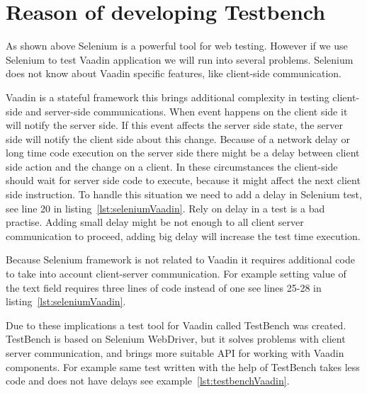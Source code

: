  \section{Reason of developing Testbench}
  	As shown above Selenium is a powerful tool for web testing. However if we use
  	Selenium to test Vaadin application we will run into several problems.
  	Selenium does not know about Vaadin specific features, like client-side
  	communication. 
  	
  	Vaadin is a stateful framework this brings additional complexity in
testing client-side and server-side communications. When event happens on the client side 
it will notify the server side. If this event affects the server side state, the
server side will notify the client side about this change.
 Because of a network delay or long time code execution on the server side there might be a delay between 
 client side action and the change on a client. In these circumstances the client-side should wait for server side code to execute,
  because it might affect the next client side instruction. To handle this
  situation we need to add a delay in Selenium test, see line 20
   in listing~\ref{lst:seleniumVaadin}. Rely on delay in a test is a bad
   practise. Adding small delay might be not enough to all client server
   communication to proceed, adding big delay will increase the test time
   execution. 
   
   Because Selenium framework is not related to Vaadin it requires additional
   code to take into account client-server communication. For example setting
   value of the text field requires three lines of code instead of one see lines
   25-28 in listing~\ref{lst:seleniumVaadin}.
   
   Due to these implications a test tool for Vaadin called TestBench was
   created. TestBench is based on Selenium WebDriver, but it solves
   problems with client server communication, and brings more suitable
   API for working with Vaadin components. For example same test written with 
   the help of TestBench takes less code and does not have delays see example~\ref{lst:testbenchVaadin}.
  	
